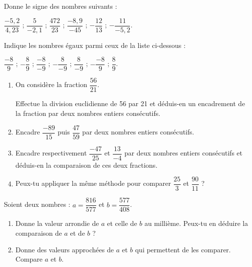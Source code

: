 

\begin{exercice}[Signes]
Donne le signe des nombres suivants :

$\dfrac{-5,2}{4,23}$ ; $\dfrac{5}{-2,1}$ ; $\dfrac{472}{23}$ ; $\dfrac{-8,9}{-45}$ ; $-\dfrac{12}{13}$ ; $-\dfrac{11}{-5,2}$.
\end{exercice}





\begin{exercice}
Indique les nombres égaux parmi ceux de la liste ci-dessous :

$\dfrac{-8}{9}$ ; $-\dfrac{8}{9}$ ; $\dfrac{-8}{-9}$ ; $-\dfrac{8}{-9}$ ; $\dfrac{8}{-9}$ ; $-\dfrac{-8}{9}$ ; $\dfrac{8}{9}$.
\end{exercice}




\begin{exercice}[Encadrement]

\begin{enumerate}
\item On considère la fraction $\dfrac{56}{21}$.

Effectue la division euclidienne de 56 par 21 et déduis-en un encadrement de la fraction par deux nombres entiers consécutifs.
\item Encadre $\dfrac{-89}{15}$ puis $\dfrac{47}{59}$ par deux nombres entiers consécutifs.
\item Encadre respectivement $\dfrac{-47}{25}$ et $\dfrac{13}{-4}$ par deux nombres entiers consécutifs et déduis-en la comparaison de ces deux fractions.
\item Peux-tu appliquer la même méthode pour comparer $\dfrac{25}{3}$ et $\dfrac{90}{11}$ ?
\end{enumerate}
\end{exercice}




\begin{exercice}
Soient deux nombres : $a =\dfrac{816}{577}$  et $b =\dfrac{577}{408}$.
\begin{enumerate}
\item Donne la valeur arrondie de $a$ et celle de $b$ au millième. Peux-tu en déduire la comparaison de $a$ et de $b$ ?
\item Donne des valeurs approchées de $a$ et $b$ qui permettent de les comparer. Compare $a$ et $b$.
\end{enumerate}
\end{exercice}





